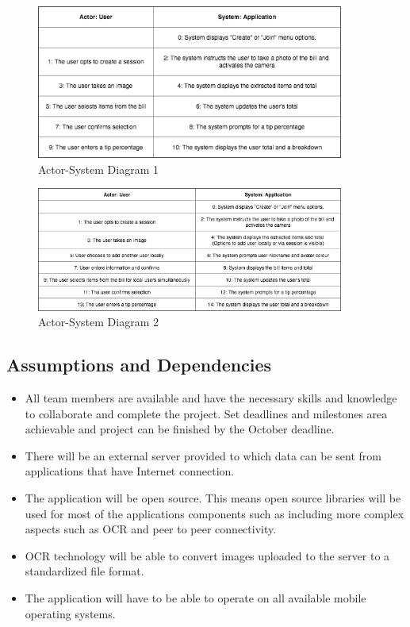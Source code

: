 \documentclass[12pt,a4paper]{article}
\begin{document}
\begin{figure}[H]

    \vspace{1cm}

    \includegraphics[width=0.9\textwidth]{diagrams/ASIM.png}
   \vspace{0.1cm}
    \caption{Actor-System Diagram 1}
    \label{Actor-System Diagram 1}
\end{figure}
    \vspace{1cm}
\begin{figure}[H]  
  \includegraphics[width=0.9\textwidth]{diagrams/ASIM2.png}
   \vspace{0.1cm}
    \caption{Actor-System Diagram 2}
    \label{Actor-System Diagram 2}

  
\end{figure}		

   	\subsection{Assumptions and Dependencies}
		 \begin{itemize}
	\item All team members are available and have the necessary skills and knowledge to collaborate and complete the project. 
Set deadlines and milestones area achievable and project can be finished by the October deadline.   
\item There will be an external server provided to which data can be sent from applications that have Internet connection. 
\item The application will be open source. This means open source libraries will be used for most of the applications components such as including more complex aspects such as OCR and peer to peer connectivity. 
\item OCR technology will be able to convert images uploaded to the server to a standardized file format.
\item The application will have to be able to operate on all available mobile operating systems. 
\end{itemize}
\end{document}
